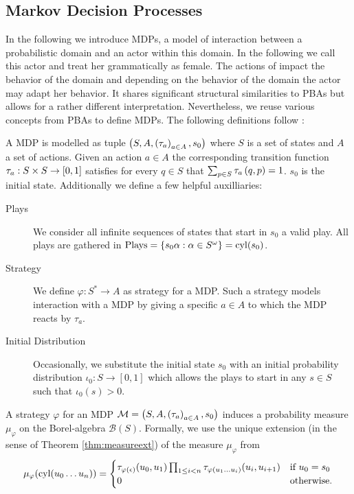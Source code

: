 \subsection{Markov Decision Processes}
In the following we introduce \acp{MDP}, a model of interaction between a 
probabilistic domain and an actor within this domain. In the following we call
this actor \eve{} and treat her grammatically as female. The actions of \eve{}
impact the behavior of the domain and depending on the behavior of the domain
the actor may adapt her behavior. It shares significant structural similarities
to \acp{PBA} but allows for a rather different interpretation. Nevertheless, we
reuse various concepts from \acp{PBA} to define \acp{MDP}. The following 
definitions follow \cite{RandAutoInfTrees}:
\begin{definition}
  A \acl*{MDP} is modelled as tuple
  $\left(S, A, \left(\tau_{a}\right)_{a\in A}, s_{0}\right)$ where $S$ is a set of states
  and $A$ a set of actions. Given an action $a\in A$ the corresponding
  transition function $\tau_{a}:S\times S\rightarrow \left[0,1\right]$ satisfies
  for every $q\in S$ that $\sum_{p\in S}\tau_{a}\left(q,p\right) = 1$.
  $s_{0}$ is the initial state. Additionally we define a few helpful
  auxilliaries:
  \begin{description}
    \item [Plays] We consider all infinite sequences of states
      that start in $s_{0}$ a valid play. All plays are gathered in
      $\operatorname{Plays} = \left\{s_{0}\alpha:\alpha\in S^{\omega}\right\} = \operatorname{cyl}(s_{0})$.
    \item [Strategy] We define $\varphi:S^{*}\rightarrow A$ as strategy for
      a \ac{MDP}. Such a strategy models interaction with a \ac{MDP} by
      giving a specific $a\in A$ to which the \ac{MDP} reacts by $\tau_{a}$.
    \item [Initial Distribution] Occasionally, we substitute the initial state
      $s_{0}$ with an initial probability distribution
      $\iota_{0}:S\rightarrow[0,1]$ which allows the plays to start in any
      $s\in S$ such that $\iota_{0}(s) > 0$.
  \end{description}
  \label{def:mdp}
\end{definition}
A strategy $\varphi$ for an \ac{MDP}
$\mathcal{M} = \left(S, A, \left(\tau_{a}\right)_{a\in A}, s_{0}\right)$ induces a
probability measure $\mu_{\varphi}$ on the Borel-algebra $\mathcal{B}(S)$.
Formally, we use the unique extension (in the sense of Theorem
\ref{thm:measureext}) of the measure $\mu_{\varphi}$ from
\begin{equation*}
  \mu_{\varphi}(\operatorname{cyl}(u_{0}\dots u_{n})) = \begin{cases}
    \tau_{\varphi(\epsilon)}(u_{0}, u_{1})\prod_{1\leq i < n}
      \tau_{\varphi(u_{1}\dots u_{i})}(u_{i}, u_{i+1})&\text{if }u_{0} =s_{0}\\
      0&\text{otherwise}.
  \end{cases}
\end{equation*}
